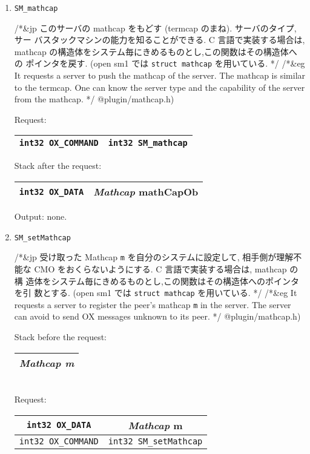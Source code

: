 \begin{enumerate}
\item
\begin{verbatim}
SM_mathcap
\end{verbatim}
/*&jp
このサーバの mathcap をもどす (termcap のまね).  サーバのタイプ, サー
バスタックマシンの能力を知ることができる.  C 言語で実装する場合は,
mathcap の構造体をシステム毎にきめるものとし,この関数はその構造体への
ポインタを戻す.  (open sm1 では {\tt struct mathcap} を用いている.
*/
/*&eg
It requests a server to push the mathcap of the server. 
The mathcap is similar to the termcap. One can know the server type
and the capability of the server from the mathcap. 
*/
@plugin/mathcap.h)

Request:
\begin{tabular}{|c|c|}  \hline
{\tt int32 OX\_COMMAND} & {\tt int32 SM\_mathcap}  \\
\hline
\end{tabular}

Stack after the request: 
\begin{tabular}{|c|c|}  \hline
{\tt int32 OX\_DATA} & {\sl Mathcap}  mathCapOb \\
\hline
\end{tabular}

Output: none.

\item
\begin{verbatim}
SM_setMathcap
\end{verbatim}
/*&jp
受け取った Mathcap {\tt m} を自分のシステムに設定して, 相手側が理解不
能な CMO をおくらないようにする.  C 言語で実装する場合は, mathcap の構
造体をシステム毎にきめるものとし,この関数はその構造体へのポインタを引
数とする.  (open sm1 では {\tt struct mathcap} を用いている.
*/
/*&eg
It requests a server to register the peer's mathcap {\tt m} in the server.
The server can avoid to send OX messages unknown to its peer.
*/
@plugin/mathcap.h)

Stack before the request:
\begin{tabular}{|c|}  \hline
{\it Mathcap m}  \\
\hline
\end{tabular}\\
Request:
\begin{tabular}{|c|c|}  \hline
{\tt int32 OX\_DATA} & {\sl Mathcap} m  \\ \hline
{\tt int32 OX\_COMMAND} & {\tt int32 SM\_setMathcap}  \\
\hline
\end{tabular}


\end{enumerate}
